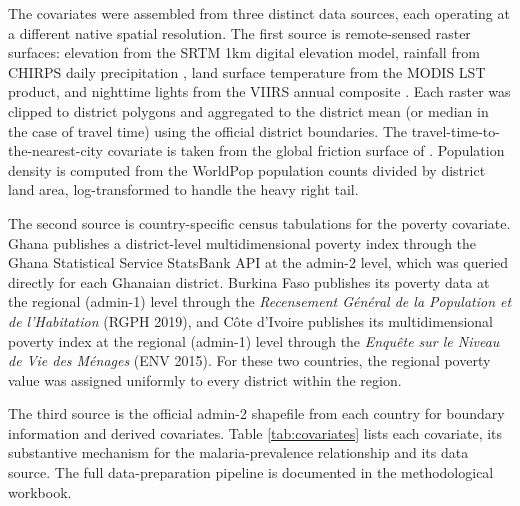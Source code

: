 \documentclass{article}
\begin{document}
The covariates were assembled from three distinct data sources, each
operating at a different native spatial resolution. The first source is
remote-sensed raster surfaces: elevation from the SRTM 1km digital
elevation model, rainfall from CHIRPS daily precipitation
\citep{weiss2020}, land surface temperature from the MODIS LST product,
and nighttime lights from the VIIRS annual composite
\citep{elvidge2014}. Each raster was clipped to district polygons and
aggregated to the district mean (or median in the case of travel time)
using the official district boundaries. The
travel-time-to-the-nearest-city covariate is taken from the global
friction surface of \citep{weiss2020}. Population density is computed
from the WorldPop population counts divided by district land area,
log-transformed to handle the heavy right tail.

The second source is country-specific census tabulations for the poverty
covariate. Ghana publishes a district-level multidimensional poverty
index through the Ghana Statistical Service StatsBank API at the admin-2
level, which was queried directly for each Ghanaian district. Burkina
Faso publishes its poverty data at the regional (admin-1) level through
the \emph{Recensement Général de la Population et de l'Habitation} (RGPH
2019), and Côte d'Ivoire publishes its multidimensional poverty index at
the regional (admin-1) level through the \emph{Enquête sur le Niveau de
Vie des Ménages} (ENV 2015). For these two countries, the regional
poverty value was assigned uniformly to every district within the
region.

The third source is the official admin-2 shapefile from each country for
boundary information and derived covariates. Table \ref{tab:covariates}
lists each covariate, its substantive mechanism for the
malaria-prevalence relationship and its data source. The full
data-preparation pipeline is documented in the methodological workbook.

\begingroup\fontsize{7}{9}\selectfont
\end{document}
